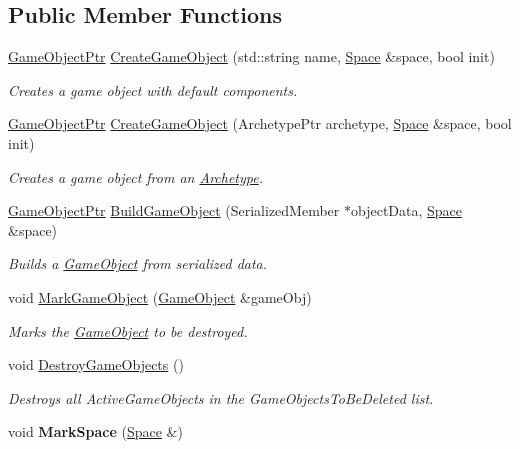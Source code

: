 \subsection*{Public Member Functions}
\begin{DoxyCompactItemize}
\item 
\hyperlink{classDCEngine_1_1GameObject}{Game\-Object\-Ptr} \hyperlink{classDCEngine_1_1Systems_1_1Factory_a22fd77962343649289f07d50fe27cbea}{Create\-Game\-Object} (std\-::string name, \hyperlink{classDCEngine_1_1Space}{Space} \&space, bool init)
\begin{DoxyCompactList}\small\item\em Creates a game object with default components. \end{DoxyCompactList}\item 
\hyperlink{classDCEngine_1_1GameObject}{Game\-Object\-Ptr} \hyperlink{classDCEngine_1_1Systems_1_1Factory_a3cc34e680424f1982f719da99282765b}{Create\-Game\-Object} (Archetype\-Ptr archetype, \hyperlink{classDCEngine_1_1Space}{Space} \&space, bool init)
\begin{DoxyCompactList}\small\item\em Creates a game object from an \hyperlink{classDCEngine_1_1Archetype}{Archetype}. \end{DoxyCompactList}\item 
\hyperlink{classDCEngine_1_1GameObject}{Game\-Object\-Ptr} \hyperlink{classDCEngine_1_1Systems_1_1Factory_af6ded32c3d92e2cfa32dc7511df268da}{Build\-Game\-Object} (Serialized\-Member $\ast$object\-Data, \hyperlink{classDCEngine_1_1Space}{Space} \&space)
\begin{DoxyCompactList}\small\item\em Builds a \hyperlink{classDCEngine_1_1GameObject}{Game\-Object} from serialized data. \end{DoxyCompactList}\item 
void \hyperlink{classDCEngine_1_1Systems_1_1Factory_a9e4faddb629e938db6e42476ae2ea078}{Mark\-Game\-Object} (\hyperlink{classDCEngine_1_1GameObject}{Game\-Object} \&game\-Obj)
\begin{DoxyCompactList}\small\item\em Marks the \hyperlink{classDCEngine_1_1GameObject}{Game\-Object} to be destroyed. \end{DoxyCompactList}\item 
void \hyperlink{classDCEngine_1_1Systems_1_1Factory_a6e50585ce35fbf1871a1c826e609a8b4}{Destroy\-Game\-Objects} ()
\begin{DoxyCompactList}\small\item\em Destroys all Active\-Game\-Objects in the Game\-Objects\-To\-Be\-Deleted list. \end{DoxyCompactList}\item 
\hypertarget{classDCEngine_1_1Systems_1_1Factory_abc681a94c6698de0deb529db472c35ac}{void {\bfseries Mark\-Space} (\hyperlink{classDCEngine_1_1Space}{Space} \&)}\label{classDCEngine_1_1Systems_1_1Factory_abc681a94c6698de0deb529db472c35ac}


\end{DoxyCompactItemize}
